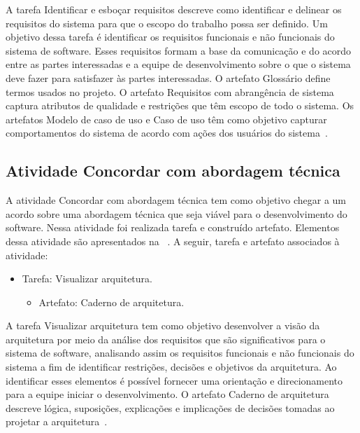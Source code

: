 %

A tarefa Identificar e esboçar requisitos descreve como identificar e delinear os requisitos do sistema para que o escopo do trabalho possa ser definido. Um objetivo dessa tarefa é identificar os requisitos funcionais e não funcionais do sistema de software. Esses requisitos formam a base da comunicação e do acordo entre as partes interessadas e a equipe de desenvolvimento sobre o que o sistema deve fazer para satisfazer às partes interessadas. O artefato Glossário define termos usados no projeto. O artefato Requisitos com abrangência de sistema captura atributos de qualidade e restrições que têm escopo de todo o sistema. Os artefatos Modelo de caso de uso e Caso de uso têm como objetivo capturar comportamentos do sistema de acordo com ações dos usuários do sistema~\cite{openup}.

\subsection{Atividade Concordar com abordagem técnica}

A atividade Concordar com abordagem técnica tem como objetivo chegar a um acordo sobre uma abordagem técnica que seja viável para o desenvolvimento do software. Nessa atividade foi realizada tarefa e construído artefato. Elementos dessa atividade são apresentados na ~. A seguir, tarefa e artefato associados à atividade:

\begin{itemize}
    \item Tarefa: Visualizar arquitetura.
    \begin{itemize}
        \item Artefato: Caderno de arquitetura.
    \end{itemize}
\end{itemize}

A tarefa Visualizar arquitetura tem como objetivo desenvolver a visão da arquitetura por meio da análise dos requisitos que são significativos para o sistema de software, analisando assim os requisitos funcionais e não funcionais do sistema a fim de identificar restrições, decisões e objetivos da arquitetura. Ao identificar esses elementos é possível fornecer uma orientação e direcionamento para a equipe iniciar o desenvolvimento. O artefato Caderno de arquitetura descreve lógica, suposições, explicações e implicações de decisões tomadas ao projetar a arquitetura~\cite{openup}.

